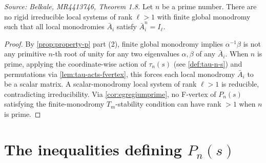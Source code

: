 \begin{theorem}[KatzQ]
  \label{thm:katz-q}
  \textit{Source: Belkale, MR4413746, Theorem 1.8.}
  Let \(n\) be a prime number. There are no rigid irreducible local systems of rank \(\ell > 1\) with finite global monodromy such that all local monodromies \(\bar{A}_i\) satisfy \(\bar{A}_i^n = I_\ell\).
\end{theorem}

\begin{proof}
  By \cref{prop:property-p} part (2), finite global monodromy implies \(\alpha^{-1}\beta\) is not any primitive \(n\)-th root of unity for any two eigenvalues \(\alpha, \beta\) of any \(\bar{A}_i\). When \(n\) is prime, applying the coordinate-wise action of \(\tau_n(s)\) (see \cref{def:tau-n-s}) and permutations via \cref{lem:tau-acts-fvertex}, this forces each local monodromy \(\bar{A}_i\) to be a scalar matrix. A scalar-monodromy local system of rank \(\ell > 1\) is reducible, contradicting irreducibility. Via \cref{cor:egregiumprime}, no F-vertex of \(P_n(s)\) satisfying the finite-monodromy \(T_m\)-stability condition can have rank \(> 1\) when \(n\) is prime.
\end{proof}

\section{The inequalities defining \texorpdfstring{\(P_n(s)\)}{Pn(s)}}

